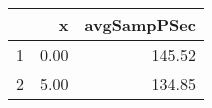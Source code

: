 \begin{table}[h]
\centering
\begin{tabular}{rrr}
  \hline
 & x & avgSampPSec \\ 
  \hline
1 & 0.00 & 145.52 \\ 
   \hline
2 & 5.00 & 134.85 \\ 
   \hline
\end{tabular}
\end{table}
